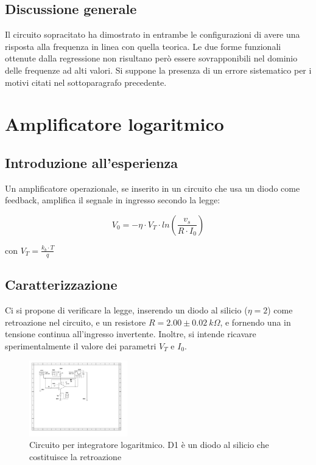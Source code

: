 \documentclass[journal]{IEEEtran}
\begin{document}
\subsection{\textbf{Discussione generale}}
Il circuito sopracitato ha dimostrato in entrambe le configurazioni di avere una risposta alla frequenza in linea con quella teorica. Le due forme funzionali ottenute dalla regressione non risultano però essere sovrapponibili nel dominio delle frequenze ad alti valori. Si suppone la presenza di un errore sistematico per i motivi citati nel sottoparagrafo precedente.


\section{\textbf{Amplificatore logaritmico}} %
\subsection{\textbf{Introduzione all'esperienza}}
Un amplificatore operazionale, se inserito in un circuito che usa un diodo come feedback, amplifica il segnale in ingresso secondo la legge:

\begin{equation}
V_0 = - \eta \cdot V_T \cdot ln( \frac{v_s}{R \cdot I_0} )
\end{equation}

con $V_T = \frac{k_{b} \cdot T}{q}$ \\
\subsection{\textbf{Caratterizzazione}}
Ci si propone di verificare la legge, inserendo un diodo al silicio ($\eta = 2$) come retroazione nel circuito, e un resistore $R = 2.00 \pm 0.02 \ k\Omega$, e fornendo una in tensione continua all'ingresso invertente. Inoltre, si intende ricavare sperimentalmente il valore dei parametri $V_T$ e $I_0$.

\begin{figure}[H]%
\begin {center}
\includegraphics[width=0.38\textwidth]{sch-simulations/output/OPA-log.pdf}
\caption{Circuito per integratore logaritmico. D1 è un diodo al silicio che costituisce la retroazione}
\label{fig:circ_log_ampl}
\end {center}
\end{figure}
\end{document}
